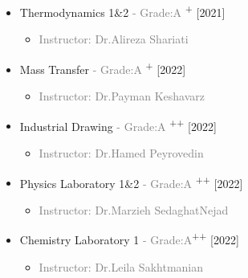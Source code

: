 \documentclass[10pt,a4paper,sans]{moderncv} %
\begin{document}
\begin{multicols}{2}
\begin{itemize}
			\item {} Thermodynamics 1\&2 \textcolor{gray}{- Grade:A }\textsuperscript{+} \hfill[2021]
               \begin{itemize}
                \item\textcolor{gray}{Instructor: 
                {Dr.Alireza Shariati}}
                \end{itemize}

              \vspace{0.5 em}  
              
              	\item {} Mass Transfer  \textcolor{gray}{- Grade:A }\textsuperscript{+} \hfill[2022]
               \begin{itemize}
                \item\textcolor{gray}{Instructor: 
                {Dr.Payman Keshavarz}}
                \end{itemize}

              \vspace{0.5 em} 
              
              	\item {} Industrial Drawing \textcolor{gray}{- Grade:A }\textsuperscript{++} \hfill[2022]
               \begin{itemize}
                \item\textcolor{gray}{Instructor: 
                {Dr.Hamed Peyrovedin}}
                \end{itemize}

              \vspace{0.5 em} 

             \item {} Physics Laboratory 1\&2 \textcolor{gray}{- Grade:A }\textsuperscript{++} \hfill[2022]
               \begin{itemize}
                \item\textcolor{gray}{Instructor: 
                {Dr.Marzieh SedaghatNejad}}
                \end{itemize}  
                
			\vspace{0.5 em} 
			
			\item {} Chemistry Laboratory 1 \textcolor{gray}{- Grade:A}\textsuperscript{++} \hfill[2022]
               \begin{itemize}
                \item\textcolor{gray}{Instructor: 
                {Dr.Leila Sakhtmanian}}
                \end{itemize}
			\vspace{0.3 em} 
			\end{itemize}
			
			
	\end{multicols}
	
\end{document}
